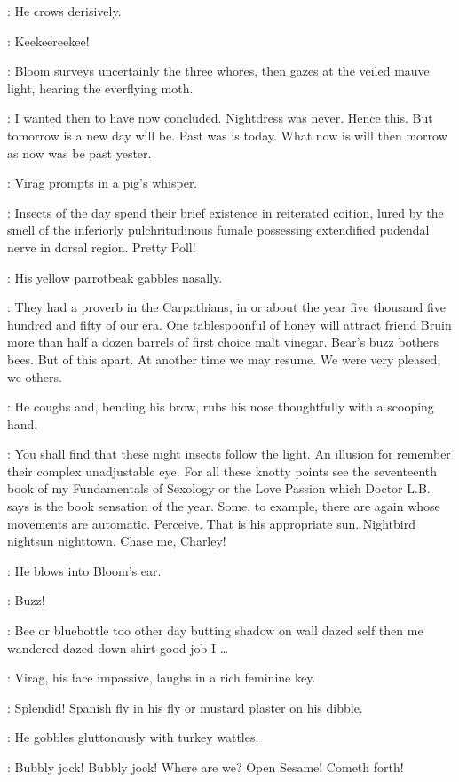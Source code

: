 :
He crows derisively.

\Virag:
Keekeereekee!

:
Bloom surveys uncertainly the three whores,
then gazes at the veiled mauve light,
hearing the everflying moth.

\Bloom:
I wanted then to have now concluded.
Nightdress was never.
Hence this.
But tomorrow is a new day will be.
Past was is today.
What now is will then morrow
as now was be past yester.

:
Virag prompts in a pig's whisper.

\Virag:
Insects of the day spend their brief existence in reiterated coition,
lured by the smell of the inferiorly pulchritudinous fumale
possessing extendified pudendal nerve in dorsal region.
Pretty Poll!

:
His yellow parrotbeak gabbles nasally.

\Virag:
They had a proverb in the Carpathians,
in or about the year
five thousand five hundred and fifty of our era.
One tablespoonful of honey will attract friend Bruin
more than half a dozen barrels of first choice malt vinegar.
Bear's buzz bothers bees.
But of this apart.
At another time we may resume.
We were very pleased,
we others.

:
He coughs and,
bending his brow,
rubs his nose thoughtfully with a scooping hand.

\Virag:
You shall find that these night insects follow the light.
An illusion for remember their complex unadjustable eye.
For all these knotty points see the seventeenth book
of my Fundamentals of Sexology or the Love Passion
which Doctor L.B.
says is the book sensation of the year.
Some,
to example,
there are again whose movements are automatic.
Perceive.
That is his appropriate sun.
Nightbird nightsun nighttown.
Chase me,
Charley!

:
He blows into Bloom's ear.

\Virag:
Buzz!

\Bloom:
Bee or bluebottle too other day butting shadow on wall dazed self
then me wandered dazed down shirt good job I \ldots%

:
Virag,
his face impassive,
laughs in a rich feminine key.

\Virag:
Splendid!
Spanish fly in his fly or mustard plaster on his dibble.

:
He gobbles gluttonously with turkey wattles.

\Virag:
Bubbly jock!
Bubbly jock!
Where are we?
Open Sesame!
Cometh forth!

